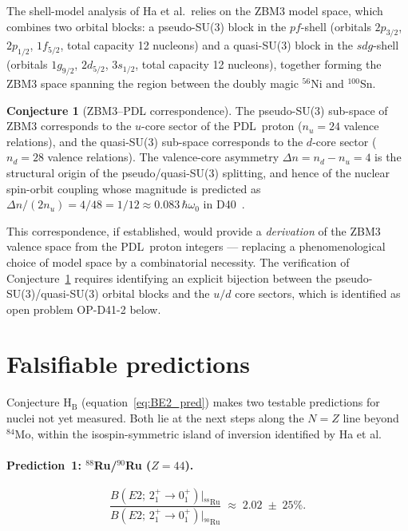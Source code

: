\documentclass[11pt,a4paper]{article}
\theoremstyle{definition}
\newtheorem{conjecture}[theorem]{Conjecture}
\newcommand{\PDL}{\textnormal{PDL}}
\newcommand{\Dn}{\Delta n}
\newcommand{\BE}[1]{B(E2;\,{2^+_1}\!\to\!{0^+_1})\big|_{#1}}
\begin{document}
The shell-model analysis of Ha et al.\ relies on the ZBM3 model space,
which combines two orbital blocks: a pseudo-SU(3) block in the $pf$-shell
(orbitals $2p_{3/2}$, $2p_{1/2}$, $1f_{5/2}$, total capacity 12 nucleons)
and a quasi-SU(3) block in the $sdg$-shell (orbitals $1g_{9/2}$, $2d_{5/2}$,
$3s_{1/2}$, total capacity 12 nucleons), together forming the ZBM3 space
spanning the region between the doubly magic $^{56}$Ni and $^{100}$Sn.

\begin{conjecture}[ZBM3--PDL correspondence]
\label{conj:ZBM3}
The pseudo-SU(3) sub-space of ZBM3 corresponds to the $u$-core sector
of the \PDL\ proton ($n_u = 24$ valence relations), and the quasi-SU(3)
sub-space corresponds to the $d$-core sector ($n_d = 28$ valence relations).
The valence-core asymmetry $\Dn = n_d - n_u = 4$ is the structural origin
of the pseudo/quasi-SU(3) splitting, and hence of the nuclear spin-orbit
coupling whose magnitude is predicted as $\Dn/(2n_u) = 4/48 = 1/12
\approx 0.083\,\hbar\omega_0$ in D40~\cite{PDL_D40_2026}.
\end{conjecture}

This correspondence, if established, would provide a \emph{derivation} of
the ZBM3 valence space from the \PDL\ proton integers --- replacing a
phenomenological choice of model space by a combinatorial necessity. The
verification of Conjecture~\ref{conj:ZBM3} requires identifying an explicit
bijection between the pseudo-SU(3)/quasi-SU(3) orbital blocks and the $u/d$
core sectors, which is identified as open problem OP-D41-2 below.

\section{Falsifiable predictions}
\label{sec:predictions}

Conjecture H$_\mathrm{B}$ (equation~\eqref{eq:BE2_pred}) makes two testable
predictions for nuclei not yet measured. Both lie at the next steps along
the $N=Z$ line beyond $^{84}$Mo, within the isospin-symmetric island of
inversion identified by Ha et al.

\paragraph{Prediction~1: $^{88}$Ru/$^{90}$Ru ($Z=44$).}
\begin{equation}
  \frac{\BE{^{88}\text{Ru}}}{\BE{^{90}\text{Ru}}}
  \;\approx\; 2.02 \;\pm\; 25\%.
  \label{eq:pred_Ru}
\end{equation}
\end{document}
